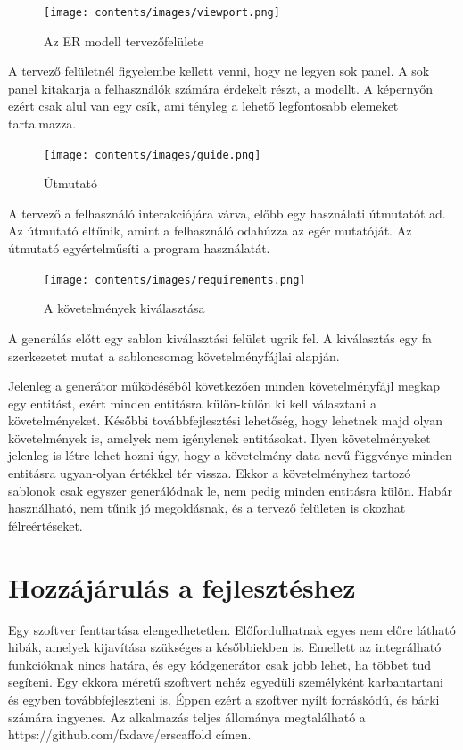 \documentclass[a4paper,12pt,oneside]{report}
\begin{document}
\begin{justify}
	\begin{figure}[H]
		\texttt{[image: contents/images/viewport.png]}
		\caption{Az ER modell tervezőfelülete}
		\label{fig:viewport}
	\end{figure}

	A tervező felületnél figyelembe kellett venni, hogy ne legyen sok panel. A sok panel kitakarja a felhasználók számára érdekelt részt, a modellt. A képernyőn ezért csak alul van egy csík, ami tényleg a lehető legfontosabb elemeket tartalmazza.


	\begin{figure}[H]
		\texttt{[image: contents/images/guide.png]}
		\caption{Útmutató}
		\label{fig:guide}
	\end{figure}

	A tervező a felhasználó interakciójára várva, előbb egy használati útmutatót ad. Az útmutató eltűnik, amint a felhasználó odahúzza az egér mutatóját. Az útmutató egyértelműsíti a program használatát. 
\end{justify}

\newpage

\begin{figure}[H]
	\texttt{[image: contents/images/requirements.png]}
	\caption{A követelmények kiválasztása}
	\label{fig:requirements}
\end{figure}

\begin{justify}
	A generálás előtt egy sablon kiválasztási felület ugrik fel. A kiválasztás egy fa szerkezetet mutat a sabloncsomag követelményfájlai alapján.

	Jelenleg a generátor működéséből következően minden követelményfájl megkap egy entitást, ezért minden entitásra külön-külön ki kell választani a követelményeket. Későbbi továbbfejlesztési lehetőség, hogy lehetnek majd olyan követelmények is, amelyek nem igénylenek entitásokat. Ilyen követelményeket jelenleg is létre lehet hozni úgy, hogy a követelmény data nevű függvénye minden entitásra ugyan-olyan értékkel tér vissza. Ekkor a követelményhez tartozó sablonok csak egyszer generálódnak le, nem pedig minden entitásra külön. Habár használható, nem tűnik jó megoldásnak, és a tervező felületen is okozhat félreértéseket.

\end{justify}

\clearpage
\section{Hozzájárulás a fejlesztéshez}
\begin{justify}
	Egy szoftver fenttartása elengedhetetlen. Előfordulhatnak egyes nem előre látható hibák, amelyek kijavítása szükséges a későbbiekben is. Emellett az integrálható funkcióknak nincs határa, és egy kódgenerátor csak jobb lehet, ha többet tud segíteni. Egy ekkora méretű szoftvert nehéz egyedüli személyként karbantartani és egyben továbbfejleszteni is. Éppen ezért a szoftver nyílt forráskódú, és bárki számára ingyenes. Az alkalmazás teljes állománya megtalálható a https://github.com/fxdave/erscaffold címen.
\end{justify}
\end{document}
